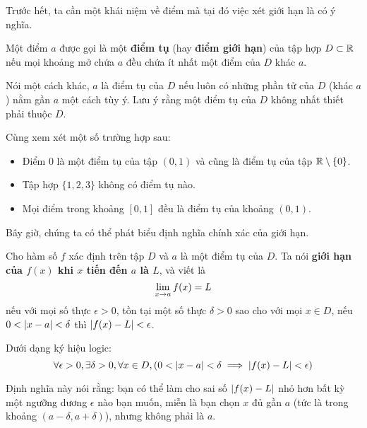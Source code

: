 Trước hết, ta cần một khái niệm về điểm mà tại đó việc xét giới hạn là có ý nghĩa.

\begin{definition}[Điểm tụ]
    Một điểm $a$ được gọi là một \textbf{điểm tụ} (hay \textbf{điểm giới hạn}) của tập hợp $D \subset \mathbb{R}$ nếu mọi khoảng mở chứa $a$ đều chứa ít nhất một điểm của $D$ khác $a$.
\end{definition}

Nói một cách khác, $a$ là điểm tụ của $D$ nếu luôn có những phần tử của $D$ (khác $a$) nằm gần $a$ một cách tùy ý. Lưu ý rằng một điểm tụ của $D$ không nhất thiết phải thuộc $D$.

\begin{example}
    Cùng xem xét một số trường hợp sau:
    \begin{itemize}
        \item Điểm 0 là một điểm tụ của tập $(0, 1)$ và cũng là điểm tụ của tập $\mathbb{R} \setminus \{0\}$.
        \item Tập hợp $\{1, 2, 3\}$ không có điểm tụ nào.
        \item Mọi điểm trong khoảng $[0,1]$ đều là điểm tụ của khoảng $(0,1)$.
    \end{itemize}
\end{example}

\noindent Bây giờ, chúng ta có thể phát biểu định nghĩa chính xác của giới hạn.

\begin{definition}
    \label{def:epsilon-delta}
    Cho hàm số $f$ xác định trên tập $D$ và $a$ là một điểm tụ của $D$. Ta nói \textbf{giới hạn của $f(x)$ khi $x$ tiến đến $a$ là $L$}, và viết là
    \begin{equation*}
        \lim\limits_{x \to a} f(x) = L
    \end{equation*}
    nếu với mọi số thực $\epsilon > 0$, tồn tại một số thực $\delta > 0$ sao cho với mọi $x \in D$, nếu $0 < \left\lvert x-a \right\rvert < \delta$ thì $\left\lvert f(x) - L \right\rvert < \epsilon$.
    
    Dưới dạng ký hiệu logic:
    \begin{equation*}
        \forall \epsilon > 0, \exists \delta > 0, \forall x \in D, (0 < \left\lvert x-a \right\rvert < \delta \implies \left\lvert f(x) - L \right\rvert < \epsilon)
    \end{equation*}
\end{definition}



Định nghĩa này nói rằng: bạn có thể làm cho sai số $\left\lvert f(x)-L \right\rvert$ nhỏ hơn bất kỳ một ngưỡng dương $\epsilon$ nào bạn muốn, miễn là bạn chọn $x$ đủ gần $a$ (tức là trong khoảng $(a-\delta, a+\delta)$), nhưng không phải là $a$.

